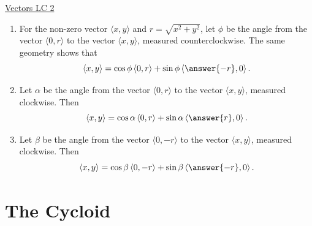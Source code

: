 \documentclass{ximera}
\begin{document}
\href{https://www.desmos.com/calculator/2hzpwtuqot}{Vectors LC 2}



\begin{question} \label{Q3rmn8lzz}
\begin{enumerate}
\item For the non-zero vector $\langle x, y \rangle$ and $r=\sqrt{x^2+y^2}$, let $\phi$ be the angle from the vector $\langle 0,r\rangle$ to the vector $\langle x, y \rangle$, measured counterclockwise. The same geometry shows that
\[
   \langle x , y \rangle = \cos\phi \left \langle 0,r \right\rangle  + \sin\phi \left\langle  \answer{-r},0  \right\rangle.
\] 
\item Let $\alpha$ be the angle from the vector $\langle 0,r \rangle$ to the vector $\langle x, y \rangle$, measured clockwise. Then
\[
   \langle x , y \rangle = \cos\alpha \left \langle 0,r \right\rangle  + \sin\alpha \left\langle \answer{r},0  \right\rangle.
\] 
\item Let $\beta$ be the angle from the vector $\langle 0,-r\rangle$ to the vector $\langle x, y \rangle$, measured clockwise. Then
\[
   \langle x , y \rangle = \cos\beta \left \langle 0,-r \right\rangle  + \sin\beta \left\langle  \answer{-r},0  \right\rangle.
\] 
\end{enumerate}
\end{question}





\section{The Cycloid}
\end{document}
